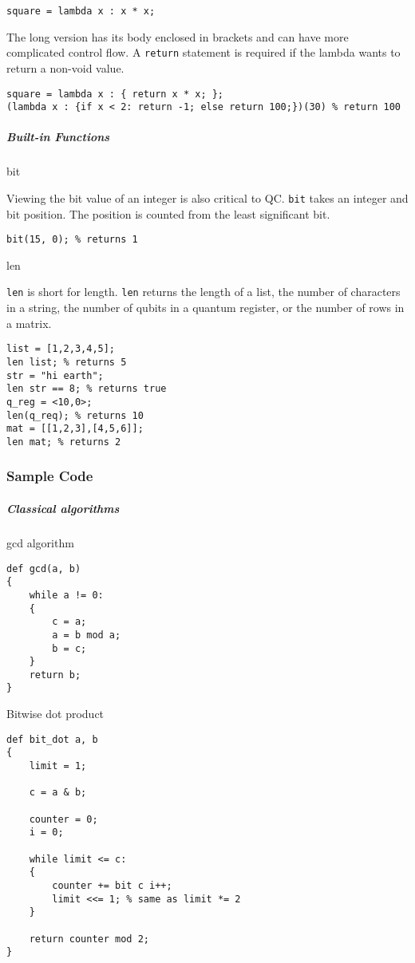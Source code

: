 \documentclass[]{article}
\begin{document}
\begin{verbatim}
square = lambda x : x * x;
\end{verbatim}

The long version has its body enclosed in brackets and can have more
complicated control flow. A \texttt{return} statement is required if the
lambda wants to return a non-void value.

\begin{verbatim}
square = lambda x : { return x * x; };
(lambda x : {if x < 2: return -1; else return 100;})(30) % return 100
\end{verbatim}

\subparagraph{Built-in Functions}\label{built-in-functions}

bit

Viewing the bit value of an integer is also critical to QC. \texttt{bit}
takes an integer and bit position. The position is counted from the
least significant bit.

\begin{verbatim}
bit(15, 0); % returns 1
\end{verbatim}

len

\texttt{len} is short for length. \texttt{len} returns the length of a
list, the number of characters in a string, the number of qubits in a
quantum register, or the number of rows in a matrix.

\begin{verbatim}
list = [1,2,3,4,5];
len list; % returns 5
str = "hi earth";
len str == 8; % returns true
q_reg = <10,0>;
len(q_req); % returns 10
mat = [[1,2,3],[4,5,6]];
len mat; % returns 2
\end{verbatim}

\subsubsection{Sample Code}\label{sample-code}

\subparagraph{Classical algorithms}\label{classical-algorithms}

gcd algorithm

\begin{verbatim}
def gcd(a, b)
{
    while a != 0:
    {
        c = a;
        a = b mod a;
        b = c;
    }
    return b;
}
\end{verbatim}

Bitwise dot product

\begin{verbatim}
def bit_dot a, b
{
    limit = 1;

    c = a & b;

    counter = 0;
    i = 0;

    while limit <= c:
    {
        counter += bit c i++;
        limit <<= 1; % same as limit *= 2
    }

    return counter mod 2;
}
\end{verbatim}
\end{document}
